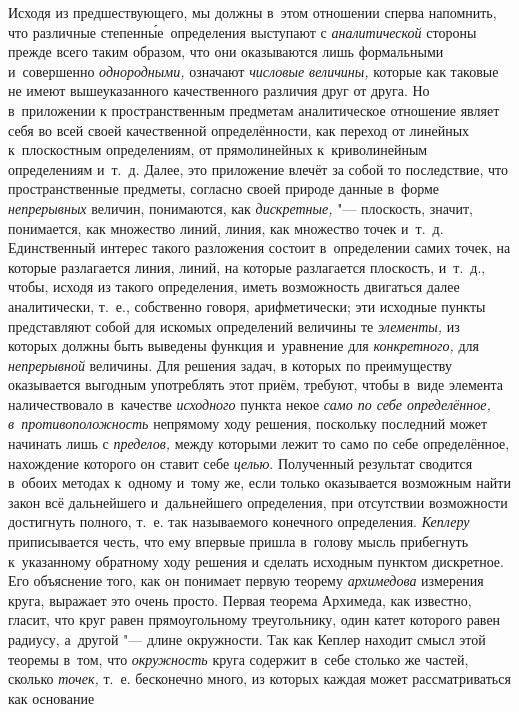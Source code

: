 Исходя из предшествующего, мы должны в~этом отношении сперва напомнить, что
различные степенн\'{ы}е~определения выступают с {\em аналитической} стороны
прежде всего таким образом, что они оказываются лишь формальными и~совершенно
{\em однородными,} означают {\em числовые величины,} которые как таковые не
имеют вышеуказанного качественного различия друг от друга. Но в~приложении к
пространственным предметам аналитическое отношение являет себя во всей своей
качественной определённости, как переход от линейных к~плоскостным
определениям, от прямолинейных к~криволинейным определениям и~т.~д. Далее, это
приложение влечёт за собой то последствие, что пространственные предметы,
согласно своей природе данные в~форме {\em непрерывных} величин, понимаются,
как {\em дискретные,} "--- плоскость, значит, понимается, как множество линий,
линия, как множество точек и~т.~д. Единственный интерес такого разложения
состоит в~определении самих точек, на которые разлагается линия, линий, на
которые разлагается плоскость, и~т.~д., чтобы, исходя из такого определения,
иметь возможность двигаться далее аналитически, т.~е., собственно говоря,
арифметически; эти исходные пункты представляют собой для искомых определений
величины те {\em элементы,} из которых должны быть выведены функция и~уравнение
для {\em конкретного,} для {\em непрерывной} величины. Для решения задач, в
которых по преимуществу оказывается выгодным употреблять этот приём, требуют,
чтобы в~виде элемента наличествовало в~качестве {\em исходного} пункта некое
{\em само по себе определённое, в~противоположность} непрямому ходу
решения, поскольку последний может начинать лишь с {\em пределов,} между
которыми лежит то само по себе определённое, нахождение которого он ставит себе
{\em целью}. Полученный результат сводится в~обоих методах к~одному и~тому же,
если только оказывается возможным найти закон всё дальнейшего и~дальнейшего
определения, при отсутствии возможности достигнуть полного, т.~е. так
называемого конечного определения. {\em Кеплеру} приписывается честь, что ему
впервые пришла в~голову мысль прибегнуть к~указанному обратному ходу решения и
сделать исходным пунктом дискретное. Его объяснение того, как он понимает
первую теорему {\em архимедова} измерения круга, выражает это очень просто.
Первая теорема Архимеда, как известно, гласит, что круг равен прямоугольному
треугольнику, один катет которого равен радиусу, а~другой "--- длине
окружности. Так как Кеплер находит смысл этой теоремы в~том, что
{\em окружность} круга содержит в~себе столько же частей, сколько {\em точек,}
т.~е. бесконечно много, из которых каждая может рассматриваться как основание
